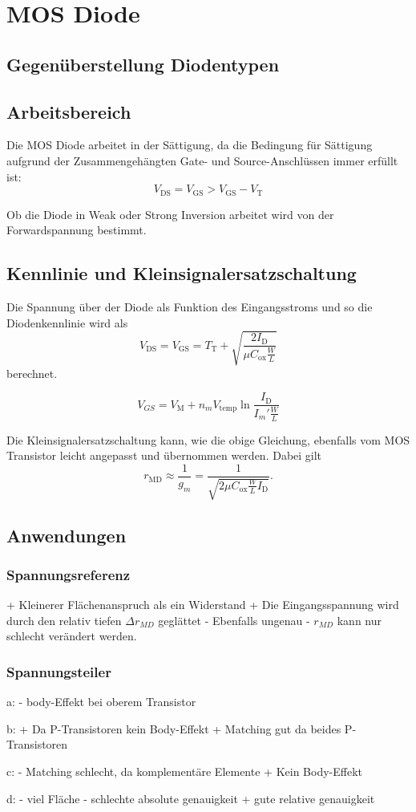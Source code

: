 \section{MOS Diode}
\subsection{Gegenüberstellung Diodentypen}

\subsection{Arbeitsbereich}
Die MOS Diode arbeitet in der Sättigung, da die Bedingung für Sättigung aufgrund der Zusammengehängten Gate- und Source-Anschlüssen immer erfüllt ist:
\[
    V_\text{DS} = V_\text{GS} > V_\text{GS} - V_\text{T}
\]

Ob die Diode in Weak oder Strong Inversion arbeitet wird von der Forwardspannung bestimmt.

\subsection{Kennlinie und Kleinsignalersatzschaltung}
Die Spannung über der Diode als Funktion des Eingangsstroms und so die Diodenkennlinie wird als
\[
    V_\text{DS} = V_\text{GS} = T_\text{T} + \sqrt{\frac{2 I_\text{D}}{\mu C_\text{ox} \frac{W}{L}}}
\]
berechnet.

\[
    V_{GS} = V_\text{M} + n_m V_\text{temp} \ln{\frac{I_\text{D}}{I_m' \frac{W}{L}}}
\]

Die Kleinsignalersatzschaltung kann, wie die obige Gleichung, ebenfalls vom MOS Transistor leicht angepasst und übernommen werden.
Dabei gilt
\[
    r_\text{MD} \approx \frac{1}{g_m} = \frac{1}{\sqrt{2 \mu C_\text{ox} \frac{W}{L} I_\text{D}}}.
\]

\subsection{Anwendungen}

\subsubsection{Spannungsreferenz}
+ Kleinerer Flächenanspruch als ein Widerstand
+ Die Eingangsspannung wird durch den relativ tiefen $\Delta r_{MD}$ geglättet
- Ebenfalls ungenau
- $r_{MD}$ kann nur schlecht verändert werden.

\subsubsection{Spannungsteiler}
a:
 - body-Effekt bei oberem Transistor

b:
 + Da P-Transistoren kein Body-Effekt
 + Matching gut da beides P-Transistoren

c:
 - Matching schlecht, da komplementäre Elemente
 + Kein Body-Effekt

d:
 - viel Fläche
 - schlechte absolute genauigkeit
 + gute relative genauigkeit